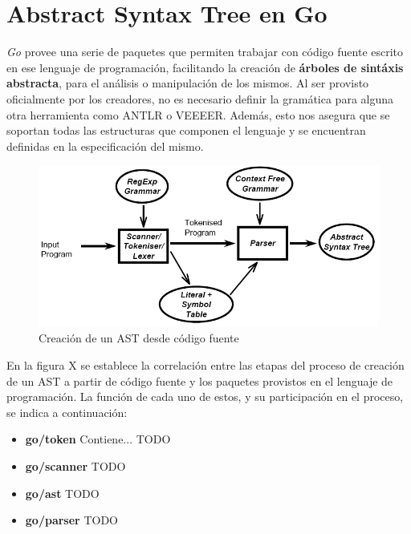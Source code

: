 \section{Abstract Syntax Tree en Go}
\textit{Go} provee una serie de paquetes que permiten trabajar con código fuente escrito en ese lenguaje de programación, facilitando la creación de \textbf{árboles de sintáxis abstracta}, para el análisis o manipulación de los mismos.
Al ser provisto oficialmente por los creadores, no es necesario definir la gramática para alguna otra herramienta como ANTLR o VEEEER.
Además, esto nos asegura que se soportan todas las estructuras que componen el lenguaje y se encuentran definidas en la especificación del mismo.

\begin{figure}[H]
  \includegraphics[width=12cm]{implementation/parsingpipeline}
  \centering
  \caption{Creación de un AST desde código fuente}
\end{figure}

En la figura X se establece la correlación entre las etapas del proceso de creación de un AST a partir de código fuente y los paquetes provistos en el lenguaje de programación.
La función de cada uno de estos, y su participación en el proceso, se indica a continuación:
\begin{itemize}
  \item \textbf{go/token} Contiene... TODO
  
  \item \textbf{go/scanner} TODO
  
  \item \textbf{go/ast} TODO
  
  \item \textbf{go/parser} TODO
\end{itemize}
